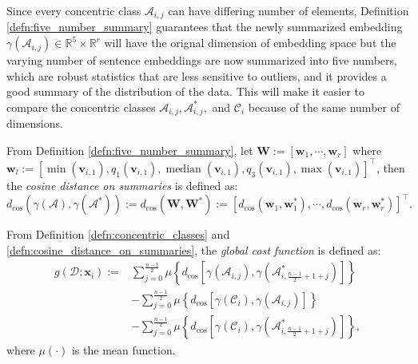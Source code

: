 \begin{remark}
    Since every concentric class $\mathscr{A}_{i,j}$ can have differing number of elements, Definition \ref{defn:five_number_summary} guarantees that the newly summarized embedding $\gamma(\mathscr{A}_{i,j})\in\mathbb{R}^5\times\mathbb{R}^r$ will have the orignal dimension of embedding space but the varying number of sentence embeddings are now summarized into five numbers, which are robust statistics that are less sensitive to outliers, and it provides a good summary of the distribution of the data. This will make it easier to compare the concentric classes $\mathscr{A}_{i,j},\mathscr{A}_{i,j}^{*},$ and $\mathscr{C}_i$ because of the same number of dimensions.
\end{remark}
\begin{defn}\label{defn:cosine_distance_on_summaries}
    From Definition \ref{defn:five_number_summary}, let $\mathbf{W}:=[\mathbf{w}_1,\cdots,\mathbf{w}_r]$ where $\mathbf{w}_l:=[\min(\mathbf{v}_{i,1}),q_1(\mathbf{v}_{i,1}),\operatorname{median}(\mathbf{v}_{i,1}),q_3(\mathbf{v}_{i,1}),\max(\mathbf{v}_{i,1})]^{\top}$, then the \textit{cosine distance on summaries} is defined as:
    \begin{equation}
        d_{\cos}(\gamma(\mathscr{A}),\gamma(\mathscr{A}^*)):=d_{\cos}(\mathbf{W},\mathbf{W}^*):=[d_{\cos}(\mathbf{w}_1,\mathbf{w}_1^*),\cdots,d_{\cos}(\mathbf{w}_r,\mathbf{w}_r^*)]^{\top}.
    \end{equation}
\end{defn}
\begin{defn}\label{defn:global_cost_function}
    From Definition \ref{defn:concentric_classes} and \ref{defn:cosine_distance_on_summaries}, the \textit{global cost function} is defined as:
    \begin{align}
        g(\mathscr{D};\mathbf{x}_{i}):=&\sum_{j=0}^{\frac{n-1}{2}}\mu\left\{d_{\cos}\left[\gamma\left(\mathscr{A}_{i,j}\right),\gamma\left(\mathscr{A}_{i,\frac{n-1}{2}+1+j}^{*}\right)\right]\right\}\nonumber\\
        &-\sum_{j=0}^{\frac{n-1}{2}}\mu\left\{d_{\cos}\left[\gamma\left(\mathscr{C}_i\right),\gamma\left(\mathscr{A}_{i,j}\right)\right]\right\}\nonumber\\
        &-\sum_{j=0}^{\frac{n-1}{2}}\mu\left\{d_{\cos}\left[\gamma\left(\mathscr{C}_i\right),\gamma\left(\mathscr{A}_{i,\frac{n-1}{2}+1+j}^{*}\right)\right]\right\},
    \end{align}
    where $\mu(\cdot)$ is the mean function.
\end{defn}

